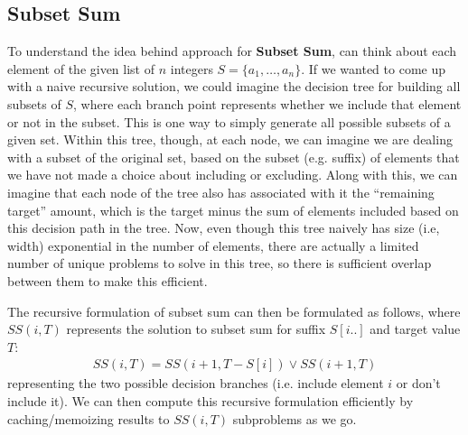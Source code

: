 \documentclass[10pt,a4paper]{article}
\begin{document}
\subsection*{Subset Sum}
\label{sec:subset-sum}

To understand the idea behind approach for \textbf{Subset Sum}, can think about each element of the given list of $n$ integers $S=\{a_1,\dots,a_n\}$. If we wanted to come up with a naive recursive solution, we could imagine the decision tree for building all subsets of $S$, where each branch point represents whether we include that element or not in the subset. This is one way to simply generate all possible subsets of a given set. Within this tree, though, at each node, we can imagine we are dealing with a subset of the original set, based on the subset (e.g. suffix) of elements that we have not made a choice about including or excluding. Along with this, we can imagine that each node of the tree also has associated with it the ``remaining target'' amount, which is the target minus the sum of elements included based on this decision path in the tree. Now, even though this tree naively has size (i.e, width) exponential in the number of elements, there are actually a limited number of unique problems to solve in this tree, so there is sufficient overlap between them to make this efficient.

The recursive formulation of subset sum can then be formulated as follows, where $SS(i,T)$ represents the solution to subset sum for suffix $S[i..]$ and target value $T$:
\begin{align*}
    SS(i, T) = SS(i+1, T-S[i]) \vee SS(i+1, T)
\end{align*}
representing the two possible decision branches (i.e. include element $i$ or don't include it). We can then compute this recursive formulation efficiently by caching/memoizing results to $SS(i,T)$ subproblems as we go.


\end{document}

